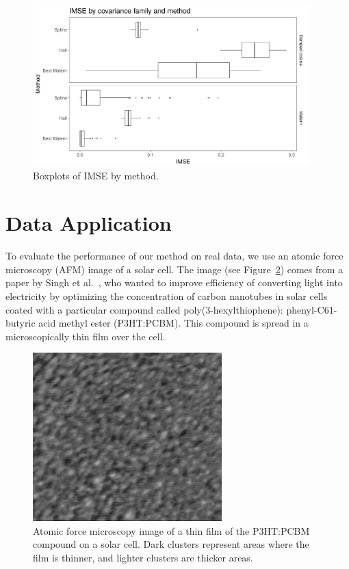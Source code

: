 \documentclass[12pt]{article}
\begin{document}
\begin{figure}[htbp]
  \centering
  \includegraphics[width=0.95\textwidth]{boxplot_integrals2.pdf}
  \caption{Boxplots of IMSE by method.}
  \label{fig:boxplot-integrals}
\end{figure}


\section{Data Application}
\label{section4:Data-Application}

To evaluate the performance of our method on real data, we use an atomic force microscopy (AFM) image of a solar cell. The image (see Figure~\ref{fig:film}) comes from a paper by Singh et al.~\cite{Singh2014}, who wanted to improve efficiency of converting light into electricity by optimizing the concentration of carbon nanotubes in solar cells coated with a particular compound called poly(3-hexylthiophene): phenyl-C61-butyric acid methyl ester (P3HT:PCBM). This compound is spread in a microscopically thin film over the cell.

\begin{figure}[htbp]
  \centering
  \includegraphics[width=0.65\textwidth]{film.png}
  \caption{Atomic force microscopy image of a thin film of the P3HT:PCBM compound on a solar cell. Dark clusters represent areas where the film is thinner, and lighter clusters are thicker areas.}
  \label{fig:film}
\end{figure}
\end{document}
